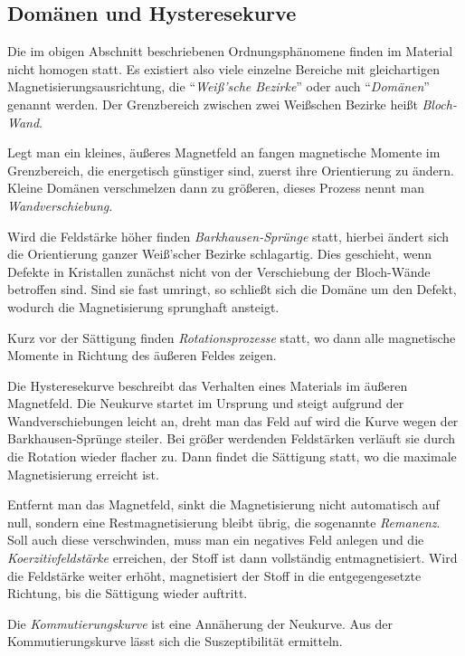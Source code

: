 \documentclass[12pt,a4paper]{scrartcl}
\numberwithin{equation}{section} %
\renewcommand{\[}{} %
\renewcommand{\]}{\noindent} %
\begin{document}
\hypertarget{domuxe4nen-und-hysteresekurve}{%
\subsection{Domänen und
Hysteresekurve}\label{domuxe4nen-und-hysteresekurve}}

Die im obigen Abschnitt beschriebenen Ordnungsphänomene finden im
Material nicht homogen statt. Es existiert also viele einzelne Bereiche
mit gleichartigen Magnetisierungsausrichtung, die ``\emph{Weiß'sche
Bezirke}'' oder auch ``\emph{Domänen}'' genannt werden. Der Grenzbereich
zwischen zwei Weißschen Bezirke heißt \emph{Bloch-Wand}.

Legt man ein kleines, äußeres Magnetfeld an fangen magnetische Momente
im Grenzbereich, die energetisch günstiger sind, zuerst ihre
Orientierung zu ändern. Kleine Domänen verschmelzen dann zu größeren,
dieses Prozess nennt man \emph{Wandverschiebung}.

Wird die Feldstärke höher finden \emph{Barkhausen-Sprünge} statt,
hierbei ändert sich die Orientierung ganzer Weiß'scher Bezirke
schlagartig. Dies geschieht, wenn Defekte in Kristallen zunächst nicht
von der Verschiebung der Bloch-Wände betroffen sind. Sind sie fast
umringt, so schließt sich die Domäne um den Defekt, wodurch die
Magnetisierung sprunghaft ansteigt.

Kurz vor der Sättigung finden \emph{Rotationsprozesse} statt, wo dann
alle magnetische Momente in Richtung des äußeren Feldes zeigen.

Die Hysteresekurve beschreibt das Verhalten eines Materials im äußeren
Magnetfeld. Die Neukurve startet im Ursprung und steigt aufgrund der
Wandverschiebungen leicht an, dreht man das Feld auf wird die Kurve
wegen der Barkhausen-Sprünge steiler. Bei größer werdenden Feldstärken
verläuft sie durch die Rotation wieder flacher zu. Dann findet die
Sättigung statt, wo die maximale Magnetisierung erreicht ist.

Entfernt man das Magnetfeld, sinkt die Magnetisierung nicht automatisch
auf null, sondern eine Restmagnetisierung bleibt übrig, die sogenannte
\emph{Remanenz}. Soll auch diese verschwinden, muss man ein negatives
Feld anlegen und die \emph{Koerzitivfeldstärke} erreichen, der Stoff ist
dann vollständig entmagnetisiert. Wird die Feldstärke weiter erhöht,
magnetisiert der Stoff in die entgegengesetzte Richtung, bis die
Sättigung wieder auftritt.

Die \emph{Kommutierungskurve} ist eine Annäherung der Neukurve. Aus der
Kommutierungskurve lässt sich die Suszeptibilität ermitteln.
\end{document}

